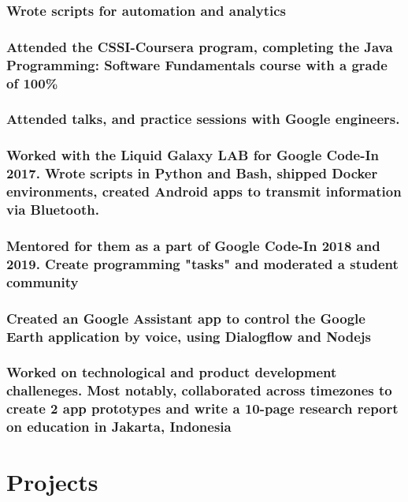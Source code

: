 \documentclass[a4paper]{resume}
\begin{document}
\subsubsection{Wrote scripts for automation and analytics}

\subsubsection{Attended the CSSI-Coursera program, completing the Java Programming: Software Fundamentals course with a grade of 100\%}
\subsubsection{Attended talks, and practice sessions with Google engineers.}

\subsubsection{Worked with the Liquid Galaxy LAB for Google Code-In 2017. Wrote scripts in Python and Bash, shipped Docker environments, created Android apps to transmit information via Bluetooth.}
\subsubsection{Mentored for them as a part of Google Code-In 2018 and 2019. Create programming "tasks" and moderated a student community}
\subsubsection{Created an Google Assistant app to control the Google Earth application by voice, using Dialogflow and Nodejs}

\subsubsection{Worked on technological and product development challeneges. Most notably, collaborated across timezones to create 2 app prototypes and write a 10-page research report on education in Jakarta, Indonesia}

\section{Projects}
\end{document}
